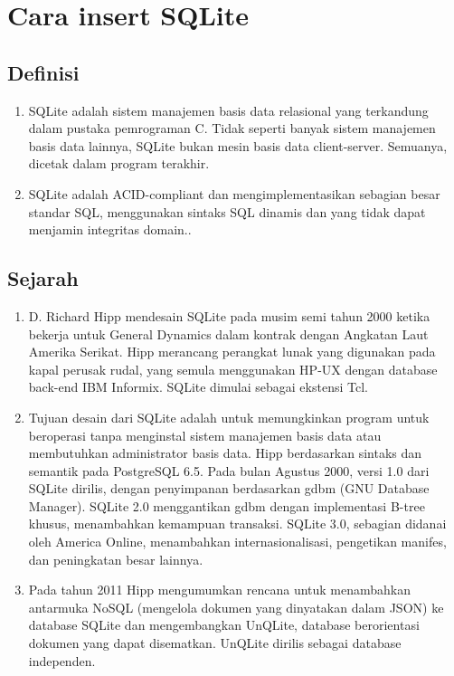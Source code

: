 \section{Cara insert SQLite}
	\subsection{Definisi}
		\begin{enumerate}
			\item SQLite adalah sistem manajemen basis data relasional yang terkandung dalam pustaka pemrograman C. Tidak seperti banyak sistem manajemen basis data lainnya, SQLite bukan mesin basis data client-server. Semuanya, dicetak dalam program terakhir.
			\item SQLite adalah ACID-compliant dan mengimplementasikan sebagian besar standar SQL, menggunakan sintaks SQL dinamis dan yang tidak dapat menjamin integritas domain..
		\end{enumerate}
	\subsection{Sejarah}
		\begin{enumerate}
			\item D. Richard Hipp mendesain SQLite pada musim semi tahun 2000 ketika bekerja untuk General Dynamics dalam kontrak dengan Angkatan Laut Amerika Serikat. Hipp merancang perangkat lunak yang digunakan pada kapal perusak rudal, yang semula menggunakan HP-UX dengan database back-end IBM Informix. SQLite dimulai sebagai ekstensi Tcl.
			\item Tujuan desain dari SQLite adalah untuk memungkinkan program untuk beroperasi tanpa menginstal sistem manajemen basis data atau membutuhkan administrator basis data. Hipp berdasarkan sintaks dan semantik pada PostgreSQL 6.5. Pada bulan Agustus 2000, versi 1.0 dari SQLite dirilis, dengan penyimpanan berdasarkan gdbm (GNU Database Manager). SQLite 2.0 menggantikan gdbm dengan implementasi B-tree khusus, menambahkan kemampuan transaksi. SQLite 3.0, sebagian didanai oleh America Online, menambahkan internasionalisasi, pengetikan manifes, dan peningkatan besar lainnya.
			\item Pada tahun 2011 Hipp mengumumkan rencana untuk menambahkan antarmuka NoSQL (mengelola dokumen yang dinyatakan dalam JSON) ke database SQLite dan mengembangkan UnQLite, database berorientasi dokumen yang dapat disematkan. UnQLite dirilis sebagai database independen.
		\end{enumerate}
